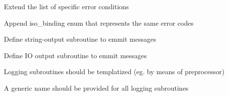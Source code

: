 
\begin{DoxyRefList}
\item[Module \mbox{\hyperlink{namespacecrierrcodes}{crierrcodes}} ]\label{todo__todo000001}%
%
Extend the list of specific error conditions 



Append iso\+\_\+binding enum that represents the same error codes 



Define string-\/output subroutine to emmit messages 



Define IO output subroutine to emmit messages  
\item[Module \mbox{\hyperlink{namespacecrilog}{crilog}} ]\label{todo__todo000002}%
%
Logging subroutines should be templatized (eg. by means of preprocessor) 



A generic name should be provided for all logging subroutines 
\end{DoxyRefList}
